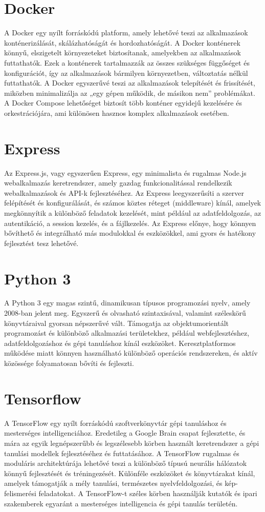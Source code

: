 \section{Docker}
A Docker egy nyílt forráskódú platform, amely lehetővé teszi az alkalmazások konténerizálását, skálázhatóságát és hordozhatóságát. A Docker konténerek könnyű, elszigetelt környezeteket biztosítanak, amelyekben az alkalmazások futtathatók. Ezek a konténerek tartalmazzák az összes szükséges függőséget és konfigurációt, így az alkalmazások bármilyen környezetben, változtatás nélkül futtathatók. A Docker egyszerűvé teszi az alkalmazások telepítését és frissítését, miközben minimalizálja az „egy gépen működik, de másikon nem” problémákat. A Docker Compose lehetőséget biztosít több konténer egyidejű kezelésére és orkestrációjára, ami különösen hasznos komplex alkalmazások esetében.

\section{Express}
Az Express.js, vagy egyszerűen Express, egy minimalista és rugalmas Node.js webalkalmazás keretrendszer, amely gazdag funkcionalitással rendelkezik webalkalmazások és API-k fejlesztéséhez. Az Express leegyszerűsíti a szerver felépítését és konfigurálását, és számos köztes réteget (middleware) kínál, amelyek megkönnyítik a különböző feladatok kezelését, mint például az adatfeldolgozás, az autentikáció, a session kezelés, és a fájlkezelés. Az Express előnye, hogy könnyen bővíthető és integrálható más modulokkal és eszközökkel, ami gyors és hatékony fejlesztést tesz lehetővé.

\section{Python 3}
A Python 3 egy magas szintű, dinamikusan típusos programozási nyelv, amely 2008-ban jelent meg. Egyszerű és olvasható szintaxisával, valamint széleskörű könyvtáraival gyorsan népszerűvé vált. Támogatja az objektumorientált programozást és különböző alkalmazási területekhez, például webfejlesztéshez, adatfeldolgozáshoz és gépi tanuláshoz kínál eszközöket. Keresztplatformos működése miatt könnyen használható különböző operációs rendszereken, és aktív közössége folyamatosan bővíti és fejleszti.

\section{Tensorflow}
A TensorFlow \cite{tensorflow2015-whitepaper} egy nyílt forráskódú szoftverkönyvtár gépi tanuláshoz és mesterséges intelligenciához. Eredetileg a Google Brain csapat fejlesztette, és mára az egyik legnépszerűbb és legszélesebb körben használt keretrendszer a gépi tanulási modellek fejlesztéséhez és futtatásához. A TensorFlow rugalmas és moduláris architektúrája lehetővé teszi a különböző típusú neurális hálózatok könnyű fejlesztését és tréningezését. Különféle eszközöket és könyvtárakat kínál, amelyek támogatják a mély tanulási, természetes nyelvfeldolgozási, és kép-felismerési feladatokat. A TensorFlow-t széles körben használják kutatók és ipari szakemberek egyaránt a mesterséges intelligencia és gépi tanulás területén.

